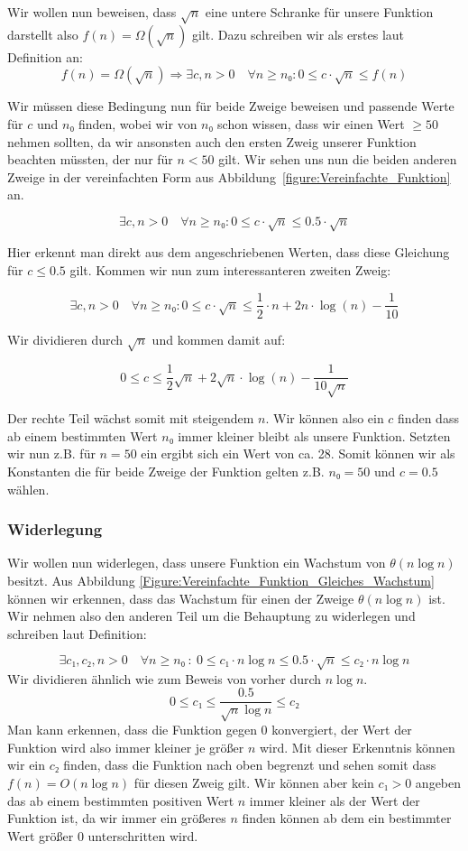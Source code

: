 \documentclass[a4paper, 12pt]{article}
\begin{document}
Wir wollen nun beweisen, dass $\sqrt n$ eine untere Schranke für unsere Funktion darstellt also $f\left(n\right) = Ω \left(\sqrt n\right)$ gilt. Dazu schreiben wir als erstes laut Definition an:
\[
	f\left(n\right)=Ω \left(\sqrt n\right) \Rightarrow
	∃ c,n > 0 \quad ∀ n≥ n₀: 0 ≤ c ⋅ \sqrt n≤
	f\left(n\right)
\]

Wir müssen diese Bedingung nun für beide Zweige beweisen und passende Werte für $c$ und $n₀$ finden, wobei wir von $n₀$ schon wissen, dass wir einen Wert $≥ 50$ nehmen sollten, da wir ansonsten auch den ersten Zweig unserer Funktion beachten müssten, der nur für $n < 50$ gilt. Wir sehen uns nun die beiden anderen Zweige in der vereinfachten Form aus Abbildung~\ref{figure:Vereinfachte_Funktion} an.

\[
	∃ c,n > 0 \quad ∀ n ≥ n₀ : 0 ≤ c⋅ \sqrt n ≤ 0.5 ⋅ \sqrt n
\]

Hier erkennt man direkt aus dem angeschriebenen Werten, dass diese Gleichung für $c ≤ 0.5$ gilt. Kommen wir nun zum interessanteren zweiten Zweig:

\[
	∃ c,n > 0 \quad ∀ n≥ n₀:
	0 ≤ c⋅ \sqrt n ≤ \frac{1}{2}⋅ n + 2 n ⋅ \log\left(n\right) - \frac{1}{10}
\]

Wir dividieren durch $\sqrt n$ und kommen damit auf:

\[
	0 ≤ c ≤
	\frac{1}{2} \sqrt n + 2 \sqrt n ⋅ \log\left(n\right) - \frac{1}{10\sqrt n}
\]

Der rechte Teil wächst somit mit steigendem $n$. Wir können also ein $c$ finden dass ab einem bestimmten Wert $n₀$ immer kleiner bleibt als unsere Funktion. Setzten wir nun z.B. für $n = 50$ ein ergibt sich ein Wert von ca. 28. Somit können wir als Konstanten die für beide Zweige der Funktion gelten z.B. $n₀=50$ und $c=0.5$ wählen.

\subsubsection{Widerlegung}

Wir wollen nun widerlegen, dass unsere Funktion ein Wachstum von $θ \left(n \log n\right)$ besitzt. Aus Abbildung \ref{Figure:Vereinfachte_Funktion_Gleiches_Wachstum} können wir erkennen, dass das Wachstum für einen der Zweige  $θ \left(n \log n\right)$ ist. Wir nehmen also den anderen Teil um die Behauptung zu widerlegen und schreiben laut Definition:

\[
	∃ c₁,c₂, n > 0 \quad ∀ n ≥ n₀ ~ : ~
	0 ≤ c₁⋅ n \log n ≤ 0.5 ⋅ \sqrt n ≤ c₂ ⋅ n \log n
\]
Wir dividieren ähnlich wie zum Beweis von vorher durch $n \log n$.
\[
	0 ≤ c₁ ≤ \frac{0.5}{\sqrt{n}\log n} ≤ c₂
\]
Man kann erkennen, dass die Funktion gegen 0 konvergiert, der Wert der Funktion wird also immer kleiner je größer $n$ wird. Mit dieser Erkenntnis können wir ein $c₂$ finden, dass die Funktion nach oben begrenzt und sehen somit dass $f\left(n\right)=O\left(n\log n\right)$ für diesen Zweig gilt. Wir können aber kein $c₁ > 0$ angeben das ab einem bestimmten positiven Wert $n$ immer kleiner als der Wert der Funktion ist, da wir immer ein größeres $n$ finden können ab dem ein bestimmter Wert größer 0 unterschritten wird.\\
\end{document}

